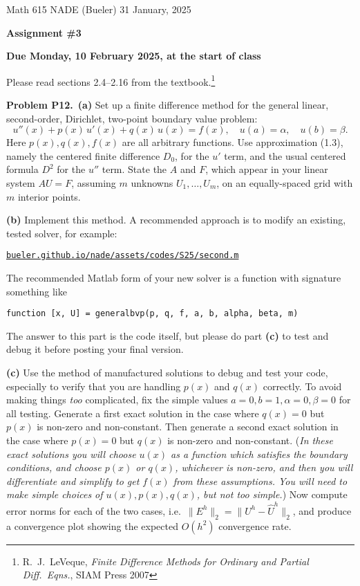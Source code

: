 \documentclass[12pt]{amsart}
\newcommand{\prob}[1]{\bigskip\noindent\textbf{#1}\quad }
\newcommand{\epart}[1]{\medskip\noindent\textbf{(#1)}\quad }
\newcommand{\ppart}[1]{\,\textbf{(#1)}\quad }
\begin{document}
\scriptsize \noindent Math 615 NADE (Bueler) \hfill 31 January, 2025
\normalsize

\medskip\bigskip

\Large\centerline{\textbf{Assignment \#3}}
\large
\bigskip

\centerline{\textbf{Due Monday, 10 February 2025, at the start of class}}
\bigskip
\normalsize

\thispagestyle{empty}

\bigskip
Please read sections 2.4--2.16 from the textbook.\footnote{R.~J.~LeVeque, \emph{Finite Difference Methods for Ordinary and Partial Diff.~Eqns.}, SIAM Press 2007}


\prob{Problem P12.}  \ppart{a}  Set up a finite difference method for the general linear, second-order, Dirichlet, two-point boundary value problem:
\begin{equation*}
u''(x) + p(x)\, u'(x) + q(x)\, u(x) = f(x), \quad u(a) = \alpha, \quad u(b) = \beta.
\end{equation*}
Here $p(x),q(x),f(x)$ are all arbitrary functions.  Use approximation (1.3), namely the centered finite difference $D_0$, for the $u'$ term, and the usual centered formula $D^2$ for the $u''$ term.  State the $A$ and $F$, which appear in your linear system $AU=F$, assuming $m$ unknowns $U_1,\dots,U_m$, on an equally-spaced grid with $m$ interior points.

\epart{b} Implement this method.  A recommended approach is to modify an existing, tested solver, for example:

\centerline{\href{https://bueler.github.io/nade/assets/codes/S25/second.m}{\texttt{bueler.github.io/nade/assets/codes/S25/second.m}}}

\medskip
\noindent The recommended Matlab form of your new solver is a function with signature something like

\smallskip
\small
\centerline{\texttt{function [x, U] = generalbvp(p, q, f, a, b, alpha, beta, m)}}

\normalsize
\medskip
\noindent The answer to this part is the code itself, but please do part \textbf{(c)} to test and debug it before posting your final version.

\epart{c}  Use the method of manufactured solutions to debug and test your code, especially to verify that you are handling $p(x)$ and $q(x)$ correctly.  To avoid making things \emph{too} complicated, fix the simple values $a=0,b=1,\alpha=0,\beta=0$ for all testing.  Generate a first exact solution in the case where $q(x)=0$ but $p(x)$ is non-zero and non-constant.  Then generate a second exact solution in the case where $p(x)=0$ but $q(x)$ is non-zero and non-constant.  (\emph{In these exact solutions you will \emph{choose} $u(x)$ as a function which satisfies the boundary conditions, and \emph{choose} $p(x)$ or $q(x)$, whichever is non-zero, and then you will differentiate and simplify to get $f(x)$ from these assumptions.  You will need to make simple choices of $u(x),p(x),q(x)$, but not \emph{too} simple.})  Now compute error norms for each of the two cases, i.e.~$\|E^h\|_2=\|U^h-\hat U^h\|_2$, and produce a convergence plot showing the expected $O(h^2)$ convergence rate.
\end{document}
